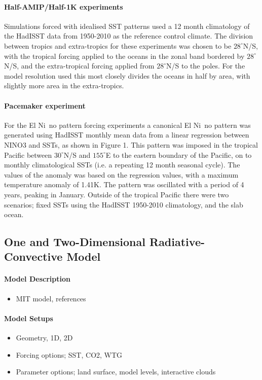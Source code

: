 \paragraph{Half-AMIP/Half-1K experiments}
Simulations forced with idealised SST patterns used a 12 month climatology of 
the HadISST data from 1950-2010 as the reference control climate. The division 
between tropics and extra-tropics for these experiments was chosen to be 
$28^{\circ}$N/S, with the tropical forcing applied to the oceans in the zonal 
band bordered by $28^{\circ}$N/S, and the extra-tropical forcing applied from 
$28^{\circ}$N/S to the poles. For the model resolution used this most closely 
divides the oceans in half by area, with slightly more area in the 
extra-tropics.

\paragraph{Pacemaker experiment}
For the El Ni{~n}o pattern forcing experiments a canonical El Ni{~n}o pattern was 
generated using HadISST monthly mean data from a linear regression between NINO3 
and SSTs, as shown in Figure 1. This pattern was imposed in the tropical Pacific 
between $30^{\circ}$N/S and $155^{\circ}$E to the eastern boundary of the 
Pacific, on to monthly climatological SSTs (i.e. a repeating 12 month seasonal 
cycle).  The values of the anomaly was based on the regression values, with a 
maximum temperature anomaly of 1.41K.  The pattern was oscillated with a period 
of 4 years, peaking in January.  Outside of the tropical Pacific there were two 
scenarios; fixed SSTs using the HadISST 1950-2010 climatology, and the slab 
ocean. 



\subsection{One and Two-Dimensional Radiative-Convective Model}

\paragraph{Model Description}
\begin{itemize}
	\item MIT model, references
\end{itemize}

\paragraph{Model Setups}
\begin{itemize}
	\item Geometry, 1D, 2D
	\item Forcing options; SST, CO2, WTG
	\item Parameter options; land surface, model levels, interactive clouds
\end{itemize}


